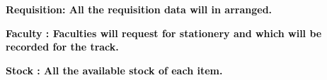 \documentclass[12pt]{report}
\renewcommand{\_}{\kern-1.5pt\textunderscore\kern-1.5pt}
\begin{document}
\vspace{\baselineskip}
\begin{adjustwidth}{0.3in}{0.84in}
\textbf{\textcolor[HTML]{0D0D0D}{Requisition: All the requisition data will in arranged.}}\par

\end{adjustwidth}


\vspace{\baselineskip}
\begin{adjustwidth}{0.3in}{0.84in}
\textbf{\textcolor[HTML]{0D0D0D}{Faculty : Faculties will request for stationery and which will be recorded for the track.}}\par

\end{adjustwidth}


\vspace{\baselineskip}
\begin{adjustwidth}{0.3in}{0.84in}
\textbf{\textcolor[HTML]{0D0D0D}{Stock : All the available stock of each item.}}\par

\end{adjustwidth}


\vspace{\baselineskip}

\vspace{\baselineskip}

\vspace{\baselineskip}

\vspace{\baselineskip}

\vspace{\baselineskip}

\vspace{\baselineskip}

\vspace{\baselineskip}

\vspace{\baselineskip}

\vspace{\baselineskip}

\vspace{\baselineskip}

\vspace{\baselineskip}

\vspace{\baselineskip}

\vspace{\baselineskip}
\end{document}
